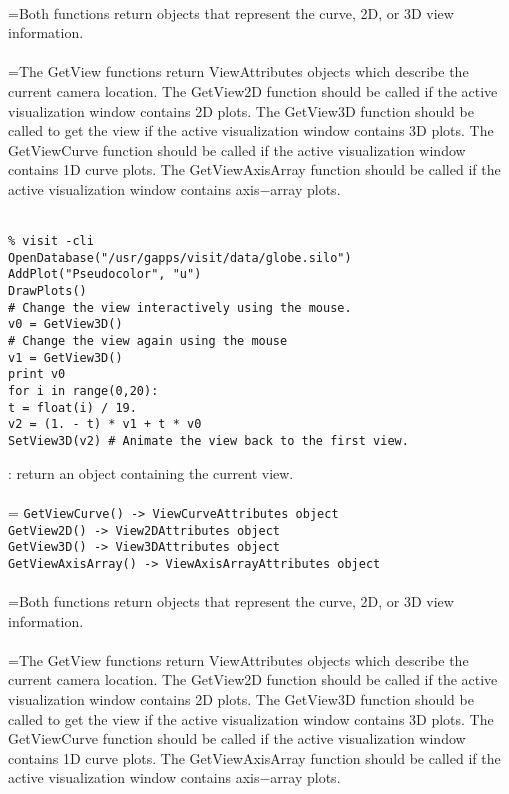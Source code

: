 \documentclass[10pt,a4paper]{report}
\begin{document}
 \\ 
\hangindent=\parindent Both functions return objects that represent the curve, 2D, or 3D view information. \\[-3mm] 

 \\ 
\hangindent=\parindent The GetView functions return ViewAttributes objects which describe the current camera location. The GetView2D function should be called if the active visualization window contains 2D plots. The GetView3D function should be called to get the view if the active visualization window contains 3D plots. The GetViewCurve function should be called if the active visualization window contains 1D curve plots.  The GetViewAxisArray function should be called if the active visualization window contains axis$-$array plots. \\[-3mm] 

\\[-6mm]
\begin{verbatim}% visit -cli
OpenDatabase("/usr/gapps/visit/data/globe.silo")
AddPlot("Pseudocolor", "u")
DrawPlots()
# Change the view interactively using the mouse.
v0 = GetView3D()
# Change the view again using the mouse
v1 = GetView3D()
print v0
for i in range(0,20):
t = float(i) / 19.
v2 = (1. - t) * v1 + t * v0
SetView3D(v2) # Animate the view back to the first view.
\end{verbatim}
\newpage


{}
: return an object containing the current view.\\[-3mm]

 \\ 
\hangindent=\parindent 
\verb!GetViewCurve() -> ViewCurveAttributes object!\\ 
\verb!GetView2D() -> View2DAttributes object!\\ 
\verb!GetView3D() -> View3DAttributes object!\\ 
\verb!GetViewAxisArray() -> ViewAxisArrayAttributes object!\\ [-3mm]

 \\ 
\hangindent=\parindent Both functions return objects that represent the curve, 2D, or 3D view information. \\[-3mm] 

 \\ 
\hangindent=\parindent The GetView functions return ViewAttributes objects which describe the current camera location. The GetView2D function should be called if the active visualization window contains 2D plots. The GetView3D function should be called to get the view if the active visualization window contains 3D plots. The GetViewCurve function should be called if the active visualization window contains 1D curve plots.  The GetViewAxisArray function should be called if the active visualization window contains axis$-$array plots. \\[-3mm] 
\end{document}
